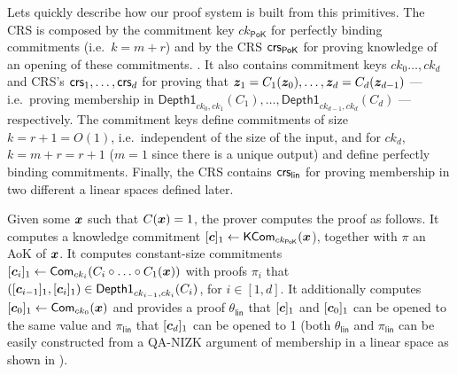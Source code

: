 Lets quickly describe how our proof system is built from this primitives. The CRS is composed by the commitment key $ck_\mathsf{PoK}$ for perfectly binding commitments (i.e.~$k=m+r$) and by the CRS $\mathsf{crs}_\mathsf{PoK}$ for proving knowledge of an opening of these commitments.
. It also contains commitment keys $ck_0\ldots,ck_d$ and CRS's $\mathsf{crs}_1,\ldots,\mathsf{crs}_d$ for proving that ${\boldsymbol{z}}_1=C_1({\boldsymbol{z}}_0),\ldots,{\boldsymbol{z}}_d=C_d({\boldsymbol{z}}_{d-1})$ --- i.e.~proving membership in $\mathsf{Depth1}_{ck_{0},ck_1}(C_1),\allowbreak\ldots,\allowbreak\mathsf{Depth1}_{ck_{d-1},ck_d}(C_d)$ --- respectively. The commitment keys define commitments of size $k=r+1=O(1)$, i.e.~independent of the size of the input, and for $ck_d$, $k=m+r=r+1$ ($m=1$ since there is a unique output) and define perfectly binding commitments. Finally, the CRS contains $\mathsf{crs}_\mathsf{lin}$ for proving membership in two different a linear spaces defined later.

Given some ${\boldsymbol{x}}$ such that $C({\boldsymbol{x}})= 1$, the prover computes the proof as follows. It computes a knowledge commitment $[{\boldsymbol{c}}]_1\gets\mathsf{KCom}_{ck_\mathsf{PoK}}({\boldsymbol{x}}$), together with $\pi$ an AoK of ${\boldsymbol{x}}$. It computes constant-size commitments $[{\boldsymbol{c}}_i]_1\gets\mathsf{Com}_{ck_i}(C_i\circ\ldots\circ C_1({\boldsymbol{x}}))$  with proofs $\pi_i$ that $([{\boldsymbol{c}}_{i-1}]_1,[{\boldsymbol{c}}_i]_1)\in\mathsf{Depth1}_{ck_{i-1},ck_i}(C_i)$, for $i\in[1,d]$. It additionally computes $[{\boldsymbol{c}}_{0}]_1\gets\mathsf{Com}_{ck_{0}}({\boldsymbol{x}})$ and provides a proof $\theta_\mathsf{lin}$ that $[{\boldsymbol{c}}]_1$ and $[{\boldsymbol{c}}_{0}]_1$ can be opened to the same value and $\pi_\mathsf{lin}$ that $[{\boldsymbol{c}}_d]_1$  can be opened to 1 (both $\theta_\mathsf{lin}$ and $\pi_\mathsf{lin}$ can be easily constructed from a QA-NIZK argument of membership in a linear space as shown in \cite{AC:GonHevRaf15}).


